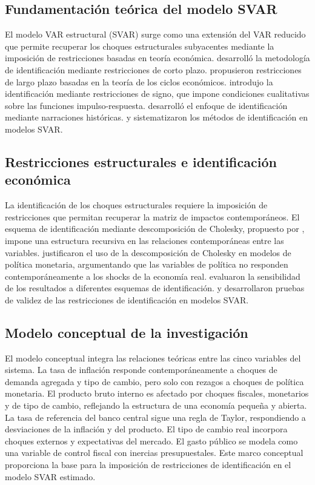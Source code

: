 \documentclass[12pt,a4paper]{article}
\begin{document}
\subsection{Fundamentación teórica del modelo SVAR}

El modelo VAR estructural (SVAR) surge como una extensión del VAR reducido que permite recuperar los choques estructurales subyacentes mediante la imposición de restricciones basadas en teoría económica. \citet{bernanke1986} desarrolló la metodología de identificación mediante restricciones de corto plazo. \citet{blanchard1989} propusieron restricciones de largo plazo basadas en la teoría de los ciclos económicos. \citet{uhlig2005} introdujo la identificación mediante restricciones de signo, que impone condiciones cualitativas sobre las funciones impulso-respuesta. \citet{rubio2020} desarrolló el enfoque de identificación mediante narraciones históricas. \citet{stock2018} y \citet{kilian2019} sistematizaron los métodos de identificación en modelos SVAR.

\subsection{Restricciones estructurales e identificación económica}

La identificación de los choques estructurales requiere la imposición de restricciones que permitan recuperar la matriz de impactos contemporáneos. El esquema de identificación mediante descomposición de Cholesky, propuesto por \citet{sims1986}, impone una estructura recursiva en las relaciones contemporáneas entre las variables. \citet{christiano1999} justificaron el uso de la descomposición de Cholesky en modelos de política monetaria, argumentando que las variables de política no responden contemporáneamente a los shocks de la economía real. \citet{bernanke2005} evaluaron la sensibilidad de los resultados a diferentes esquemas de identificación. \citet{kilian2011} y \citet{inoue2013} desarrollaron pruebas de validez de las restricciones de identificación en modelos SVAR.

\subsection{Modelo conceptual de la investigación}

El modelo conceptual integra las relaciones teóricas entre las cinco variables del sistema. La tasa de inflación responde contemporáneamente a choques de demanda agregada y tipo de cambio, pero solo con rezagos a choques de política monetaria. El producto bruto interno es afectado por choques fiscales, monetarios y de tipo de cambio, reflejando la estructura de una economía pequeña y abierta. La tasa de referencia del banco central sigue una regla de Taylor, respondiendo a desviaciones de la inflación y del producto. El tipo de cambio real incorpora choques externos y expectativas del mercado. El gasto público se modela como una variable de control fiscal con inercias presupuestales. Este marco conceptual proporciona la base para la imposición de restricciones de identificación en el modelo SVAR estimado.
\end{document}
